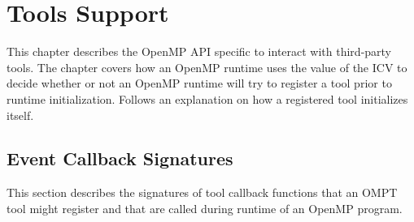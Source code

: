 %
%
%
%
%
%
%
%
%
%


\chapter{Tools Support}
\label{chap:ToolsSupport}

This chapter describes the OpenMP API specific to interact with third-party tools.
The chapter covers how an OpenMP runtime uses the value of the  ICV to decide whether or not an OpenMP runtime will try to register a tool prior to runtime initialization.
Follows an explanation on how a registered tool initializes itself.

\section{Event Callback Signatures}
\label{sec:ToolsSupport_callback_signatures}

This section describes the signatures of tool callback functions that an OMPT 
tool might register and that are called during runtime of an OpenMP program.

